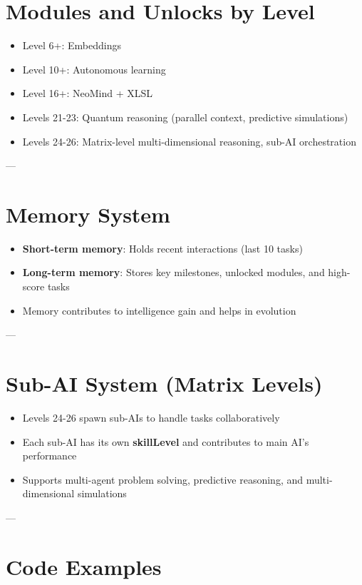 \documentclass[a4paper,12pt]{article}
\begin{document}
\section{Modules and Unlocks by Level}
\begin{itemize}
    \item Level 6+: Embeddings
    \item Level 10+: Autonomous learning
    \item Level 16+: NeoMind + XLSL
    \item Levels 21-23: Quantum reasoning (parallel context, predictive simulations)
    \item Levels 24-26: Matrix-level multi-dimensional reasoning, sub-AI orchestration
\end{itemize}

---

\section{Memory System}
\begin{itemize}
    \item \textbf{Short-term memory}: Holds recent interactions (last 10 tasks)
    \item \textbf{Long-term memory}: Stores key milestones, unlocked modules, and high-score tasks
    \item Memory contributes to intelligence gain and helps in evolution
\end{itemize}

---

\section{Sub-AI System (Matrix Levels)}
\begin{itemize}
    \item Levels 24-26 spawn sub-AIs to handle tasks collaboratively
    \item Each sub-AI has its own \textbf{skillLevel} and contributes to main AI's performance
    \item Supports multi-agent problem solving, predictive reasoning, and multi-dimensional simulations
\end{itemize}

---

\section{Code Examples}
\end{document}
